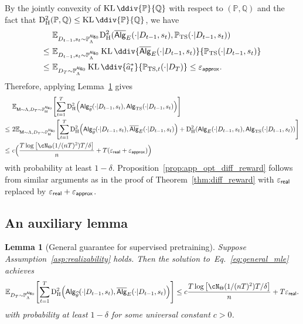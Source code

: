 \documentclass[10pt]{article}
\newtheorem{lemma}[theorem]{Lemma}
\renewcommand{\epsilon}{\varepsilon}
\newcommand{\eps}{\varepsilon}
\newcommand{\KL}{\operatorname{KL}\ddiv}
\newcommand{\<}{\left\langle}
\renewcommand{\>}{\right\rangle}
\newcommand{\paren}[1]{{\left( #1 \right)}}
\newcommand{\brac}[1]{{\left[ #1 \right]}}
\newcommand{\E}{\mathbb{E}}
\renewcommand{\P}{\mathbb{P}}
\newcommand{\Q}{\mathbb{Q}}
\newcommand{\inst}{{\mathsf{M}}}
\newcommand{\HelDs}{{\mathrm{D}^2_{\mathrm{H}}}}
\newcommand{\TS}{{\mathrm{TS}}}
\newcommand{\state}{{s}}
\newcommand{\action}{{a}}
\newcommand{\totlen}{{T}}
\newcommand{\sAlg}{{\mathsf{Alg}}}
\newcommand{\osAlg}{\overline{\mathsf{Alg}}}
\newcommand{\dset}{{D}}
\newcommand{\Numobs}{{n}}
\newcommand{\Parspace}{{\Theta}}
\newcommand{\appeps}{\eps_{{\mathsf{approx}}}}
\newcommand{\EstPar}{{\widehat{\theta}}}
\newcommand{\prior}{{\Lambda}}
\newcommand{\shortexp}{{E}}
\newcommand{\geneps}{{\epsilon}_{\sf real}}
\begin{document}
By the jointly convexity of $\KL{\P}{\Q}$ with respect to $(\P,\Q)$ and the fact that $\HelDs(\P,\Q)\leq\KL{\P}{\Q}$, we have
\begin{align*}
  &~\E_{\dset_{t-1},\state_t\sim\P_\prior^{\sAlg_0}}\HelDs(\osAlg_{\shortexp}(\cdot|\dset_{t-1},\state_t),\P_{\TS}(\cdot|\dset_{t-1},\state_t))\\
  \leq &~
  \E_{\dset_{t-1},\state_t\sim\P_\prior^{\sAlg_0}}\KL{\osAlg_{\shortexp}(\cdot|\dset_{t-1},\state_t)}{\P_{\TS}(\cdot|\dset_{t-1},\state_t)}\\
   \leq &~
 \E_{\dset_\totlen\sim\P_{\prior}^{\sAlg_0}}\KL{\widehat\action^*_t}{\P_{\TS,t}(\cdot|\dset_\totlen)}\leq\appeps.
\end{align*} Therefore, applying Lemma~\ref{lm:general_imit} gives
 \begin{align*}
        &~\E_{\inst\sim \prior, \dset_\totlen\sim \P^{\sAlg_0}_\inst}\brac{ \sum_{t=1}^\totlen \HelDs\paren{ \sAlg_{{\EstPar}}(\cdot|\dset_{t-1},\state_t ), \sAlg_{\TS}(\cdot|\dset_{t-1},\state_t )} }\\
        \le&~
        2\E_{\inst\sim \prior, \dset_\totlen\sim \P^{\sAlg_0}_\inst}\brac{ \sum_{t=1}^\totlen \HelDs\paren{ \sAlg_{{\EstPar}}(\cdot|\dset_{t-1},\state_t ), \osAlg_{\shortexp}(\cdot|\dset_{t-1},\state_t )}+\HelDs\paren{ \sAlg_{{\shortexp}}(\cdot|\dset_{t-1},\state_t ), \sAlg_{\TS}(\cdot|\dset_{t-1},\state_t )} }\\
       \le&~
       c\Big(\frac{\totlen \log \brac{ \cN_{\Parspace}(1/(\Numobs\totlen)^2) \totlen/\delta } }{n} + \totlen(\geneps+\appeps)\Big)
    \end{align*}
    with probability at least $1-\delta$. Proposition~\ref{prop:app_opt_diff_reward} follows from similar arguments as in the proof of Theorem~\ref{thm:diff_reward} with $\geneps$ replaced by $\geneps+\appeps$.

\subsection{An auxiliary lemma}

\begin{lemma}[General guarantee for supervised pretraining]\label{lm:general_imit}
Suppose Assumption~\ref{asp:realizability} holds. Then  the solution to~Eq.~\eqref{eq:general_mle} achieves
\begin{align*}
\E_{\dset_\totlen\sim \P^{\sAlg_0}_\prior}\brac{ \sum_{t=1}^\totlen \HelDs\paren{ \sAlg_{{\EstPar}}(\cdot|\dset_{t-1},\state_t ), \osAlg_{\shortexp}(\cdot|\dset_{t-1},\state_t )} } \le c\frac{\totlen \log \brac{ \cN_{\Parspace}(1/(\Numobs\totlen)^2) \totlen/\delta } }{n} + \totlen\geneps.
\end{align*}
with probability at least $1-\delta$ for some universal constant $c>0$.
\end{lemma}
\end{document}

